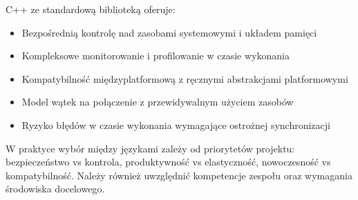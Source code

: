 C++ ze standardową biblioteką oferuje:
\begin{itemize}
    \item Bezpośrednią kontrolę nad zasobami systemowymi i układem pamięci
    \item Kompleksowe monitorowanie i profilowanie w czasie wykonania  
    \item Kompatybilność międzyplatformową z ręcznymi abstrakcjami platformowymi
    \item Model wątek na połączenie z przewidywalnym użyciem zasobów
    \item Ryzyko błędów w czasie wykonania wymagające ostrożnej synchronizacji
\end{itemize}

W praktyce wybór między językami zależy od priorytetów projektu: bezpieczeństwo vs kontrola, produktywność vs elastyczność, nowoczesność vs kompatybilność. Należy również uwzględnić kompetencje zespołu oraz wymagania środowiska docelowego.


